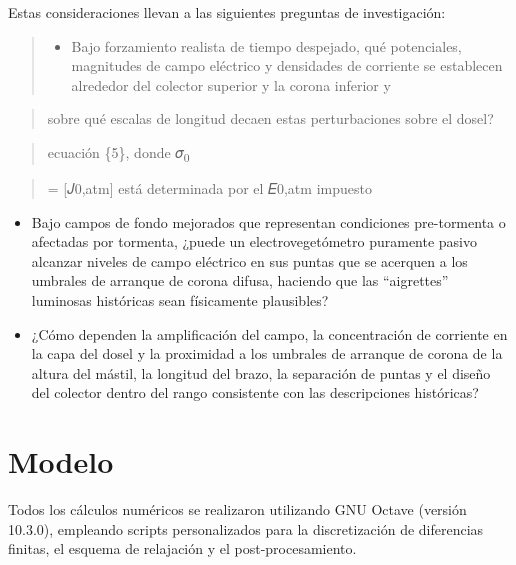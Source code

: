 \documentclass[
]{article}
\providecommand{\tightlist}{%
  \setlength{\itemsep}{0pt}\setlength{\parskip}{0pt}}
\begin{document}
Estas consideraciones llevan a las siguientes preguntas de
investigación:

\begin{quote}
\begin{itemize}
\tightlist
\item
  Bajo forzamiento realista de tiempo despejado, qué potenciales,
  magnitudes de campo eléctrico y densidades de corriente se establecen
  alrededor del colector superior y la corona inferior y
\end{itemize}
\end{quote}

\begin{quote}
sobre qué escalas de longitud decaen estas perturbaciones sobre el
dosel?
\end{quote}

\begin{quote}
ecuación \{5\}, donde 𝜎\textsubscript{0}
\end{quote}

\begin{quote}
= {[}𝐽0,atm{]} está determinada por el 𝐸0,atm impuesto
\end{quote}

\begin{itemize}
\item
  Bajo campos de fondo mejorados que representan condiciones
  pre-tormenta o afectadas por tormenta, ¿puede un electrovegetómetro
  puramente pasivo alcanzar niveles de campo eléctrico en sus puntas que
  se acerquen a los umbrales de arranque de corona difusa, haciendo que
  las ``aigrettes'' luminosas históricas sean físicamente plausibles?
\item
  ¿Cómo dependen la amplificación del campo, la concentración de
  corriente en la capa del dosel y la proximidad a los umbrales de
  arranque de corona de la altura del mástil, la longitud del brazo, la
  separación de puntas y el diseño del colector dentro del rango
  consistente con las descripciones históricas?
\end{itemize}

\section{Modelo}\label{modelo}

Todos los cálculos numéricos se realizaron utilizando GNU Octave
(versión 10.3.0), empleando scripts personalizados para la
discretización de diferencias finitas, el esquema de relajación y el
post-procesamiento.
\end{document}
